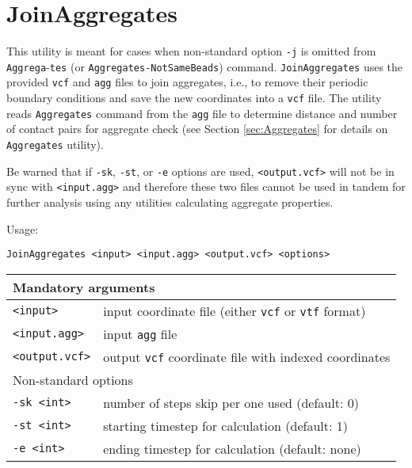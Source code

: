 \section{JoinAggregates} \label{sec:JoinAggregates}

This utility is meant for cases when non-standard option \texttt{-j} is
omitted from \texttt{Aggrega}-\texttt{tes} (or \texttt{Aggregates-NotSameBeads})
command. \texttt{JoinAggregates} uses the provided \texttt{vcf} and
\texttt{agg} files to join aggregates, i.e., to remove their periodic boundary
conditions and save the new coordinates into a \texttt{vcf} file. The
utility reads \texttt{Aggregates} command from the \texttt{agg} file to
determine distance and number of contact pairs for aggregate check (see
Section \ref{sec:Aggregates} for details on \texttt{Aggregates} utility).

Be warned that if \texttt{-sk}, \texttt{-st}, or \texttt{-e} options are
used, \texttt{<output.vcf>} will not be in sync with \texttt{<input.agg>}
and therefore these two files cannot be used in tandem for further analysis
using any utilities calculating aggregate properties.

Usage:

\vspace{1em}
\noindent
\texttt{JoinAggregates <input> <input.agg> <output.vcf> <options>}

\vspace{1em}
\noindent
\begin{longtable}{p{}p{}}
  \toprule
  \multicolumn{2}{l}{Mandatory arguments} \\
  \midrule
  \texttt{<input>} & input coordinate file (either \texttt{vcf} or
    \texttt{vtf} format) \\
  \texttt{<input.agg>} & input \texttt{agg} file \\
  \texttt{<output.vcf>} & output \texttt{vcf} coordinate file with indexed
    coordinates \\
  \toprule
  \multicolumn{2}{l}{Non-standard options} \\
  \midrule
  \texttt{-sk <int>} & number of steps skip per one used (default: 0) \\
  \texttt{-st <int>} & starting timestep for calculation (default: 1) \\
  \texttt{-e <int>} & ending timestep for calculation (default: none) \\
  \bottomrule
\end{longtable}
